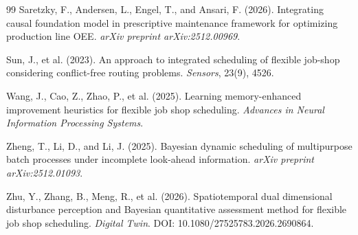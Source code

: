 \documentclass[11pt,a4paper]{article}
\begin{document}
\begin{thebibliography}{99}
Saretzky, F., Andersen, L., Engel, T., and Ansari, F. (2026).
Integrating causal foundation model in prescriptive maintenance framework for
optimizing production line OEE.
\emph{arXiv preprint arXiv:2512.00969}.

Sun, J., et al. (2023).
An approach to integrated scheduling of flexible job-shop considering
conflict-free routing problems.
\emph{Sensors}, 23(9), 4526.

Wang, J., Cao, Z., Zhao, P., et al. (2025).
Learning memory-enhanced improvement heuristics for flexible job shop scheduling.
\emph{Advances in Neural Information Processing Systems}.

Zheng, T., Li, D., and Li, J. (2025).
Bayesian dynamic scheduling of multipurpose batch processes under incomplete
look-ahead information.
\emph{arXiv preprint arXiv:2512.01093}.

Zhu, Y., Zhang, B., Meng, R., et al. (2026).
Spatiotemporal dual dimensional disturbance perception and Bayesian
quantitative assessment method for flexible job shop scheduling.
\emph{Digital Twin}. DOI: 10.1080/27525783.2026.2690864.

\end{thebibliography}
\end{document}
